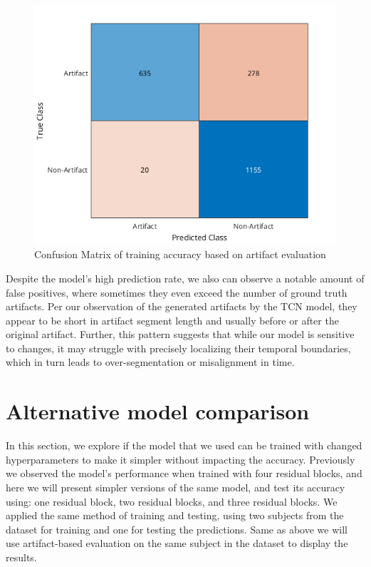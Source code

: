 \documentclass[12pt,a4paper,titlepage,openany]{report}
\begin{document}
\begin{figure}[H]
    \centering
    \includegraphics[width=1\linewidth]{images/new_training/artifact_conf_matrix.png}
    \caption{Confusion Matrix of training accuracy based on artifact evaluation}
    \label{fig:artifact-conv-matrix}
\end{figure}

Despite the model's high prediction rate, we also can observe a notable amount of false positives, where sometimes they even exceed the number of ground truth artifacts. Per our observation of the generated artifacts by the TCN model, they appear to be short in artifact segment length and usually before or after the original artifact. Further, this pattern suggests that while our model is sensitive to changes, it may struggle with precisely localizing their temporal boundaries, which in turn leads to over-segmentation or misalignment in time.

\newpage
\section{Alternative model comparison}

In this section, we explore if the model that we used can be trained with changed hyperparameters to make it simpler without impacting the accuracy. Previously we observed the model's performance when trained with four residual blocks, and here we will present simpler versions of the same model, and test its accuracy using: one residual block, two residual blocks, and three residual blocks.
We applied the same method of training and testing, using two subjects from the dataset for training and one for testing the predictions. Same as above we will use artifact-based evaluation on the same subject in the dataset to display the results.
\end{document}
